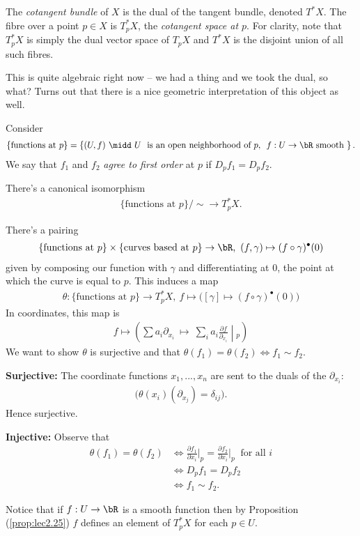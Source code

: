 \begin{defn}\label{defn:cotangent-bundle}
	The \emph{cotangent bundle} of $X$ is the dual of the tangent bundle, denoted $T^*X$. The fibre over a point $p \in X$ is $T^*_pX$, the \emph{cotangent space at $p$}. For clarity, note that $T^*_pX$ is simply the dual vector space of $T_pX$ and $T^*X$ is the disjoint union of all such fibres.
\end{defn}
This is quite algebraic right now -- we had a thing and we took the dual, so what? Turns out that there is a nice geometric interpretation of this object as well.

Consider
\begin{align*}
	\{\text{functions at $p$}\} = \left\{(U,f) ~ \midd ~ U ~\text{ is an open neighborhood of $p$, }~ f:U\to \bR \text{ smooth }\right\}.
\end{align*}
We say that $f_1$ and $f_2$ \emph{agree to first order} at $p$ if $D_pf_1 = D_pf_2$.
\begin{prop}\label{prop:lec2.25}
	There's a canonical isomorphism
	\begin{align*}
		\{\text{functions at $p$}\}/\sim \to T^*_pX.
	\end{align*}
\end{prop}
\begin{prf}
	There's a pairing
	\begin{align*}
		\{\text{functions at $p$}\} \times \{\text{curves based at $p$}\} \to \bR, ~ (f,\gamma) \mapsto (f\circ \gamma)^\bullet(0)
	\end{align*}
	given by composing our function with $\gamma$ and differentiating at $0$, the point at which the curve is equal to $p$. This induces a map
	\begin{align*}
		\theta: \{\text{functions at $p$}\} \to T^*_pX, ~ f\mapsto \big([\gamma] \mapsto (f\circ \gamma)^\bullet(0)\big)
	\end{align*}
	In coordinates, this map is
	\begin{align}\tag{$\ast$}
		f \mapsto \left(\sum a_i\partial_{x_i} ~\mapsto~ \sum_i a_i \frac{\partial f}{\partial_{x_i}}\middle |_p \right)
	\end{align}
	We want to show $\theta$ is surjective and that $\theta(f_1) = \theta(f_2)\iff f_1 \sim f_2$.

	\textbf{Surjective:} The coordinate functions $x_1,...,x_n$ are sent to the duals of the $\partial_{x_i}$:
	\begin{align*}
		\big(\theta(x_i)(\partial_{x_j}) = \delta_{ij}\big).
	\end{align*}
	Hence surjective.

	\textbf{Injective:} Observe that
	\begin{align*}
		\theta(f_1) = \theta(f_2) &\iff \frac{\partial f_1}{\partial x_i}\Big|_p = \frac{\partial f_2}{\partial x_i}\Big|_p ~ \text{ for all $i$} \\
								  &\iff D_p f_1 = D_p f_2 \\
								  &\iff f_1 \sim f_2.
	\end{align*}
\end{prf}
Notice that if $f:U\to \bR$ is a smooth function then by Proposition (\ref{prop:lec2.25}) $f$ defines an element of $T_p^*X$ for each $p \in U$.

